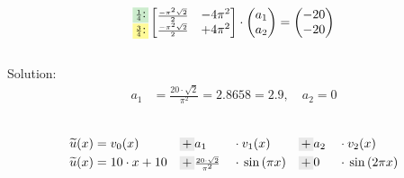 \documentclass[
final,
a4paper,
oneside,
parskip=full,
headings=standardclasses,
headings=big,
pointednumbers,
fleqn
]{scrartcl}
\newcommand{\tfillg}[1]{\tfillc[#1][Green!20]}
\newcommand{\tfilly}[1]{\tfillc[#1][yellow!40]}
\newcommand{\tfillgr}[1]{\tfillc[#1][Gray!20]}
\newcommand{\fs}[2]{{\scriptstyle\frac{#1}{#2}}}
\newcommand{\kl}[1]{{\left( #1 \right)}}
\begin{document}
    {\setlength{\abovedisplayskip}{-12pt}
    \setlength{\belowdisplayskip}{3pt}
    \begin{align*}
        \begin{matrix}
            \tfillg{$\fs{1}{4}$:} \\
            \tfilly{$\fs{3}{4}$:} \\
        \end{matrix}
        \begin{bmatrix}
            \fs{-\pi^2 \sqrt{2}}{2} & -4\pi^2 \\
            \fs{-\pi^2 \sqrt{2}}{2} & +4\pi^2 \\
        \end{bmatrix} \cdot
        \begin{pmatrix}
            a_1 \\
            a_2
        \end{pmatrix} = 
        \begin{pmatrix}
            -20 \\
            -20
        \end{pmatrix} 
    \end{align*}} \\
    Solution: \\
    {\setlength{\abovedisplayskip}{-6pt}
    \setlength{\belowdisplayskip}{-24pt}
    \begin{align*}
    a_1 &= \fs{20 \cdot \sqrt{2}}{\pi^2} = 2.8658 = 2.9, \quad a_2 = 0 \\
    \end{align*}} \\
    {\setlength{\abovedisplayskip}{-12pt}
    \setlength{\belowdisplayskip}{-6pt}
    \begin{alignat*}{8}
        \widetilde{u}\kl{x} & = v_0\kl{x}       &{} \tfillgr{$+$} {} & a_1                           &{} \cdot {} &
                                v_1\kl{x}       &{} \tfillgr{$+$} {} & a_2 &{} \cdot {} & v_2\kl{x} \\
        \widetilde{u}\kl{x} & = 10 \cdot x + 10 &{} \tfillgr{$+$} {} & \fs{20 \cdot \sqrt{2}}{\pi^2} &{} \cdot {} &
                                \sin\kl{\pi x}  &{} \tfillgr{$+$} {} & 0 &{} \cdot {} & \sin\kl{2 \pi x} \\
    \end{alignat*}}
\end{document}
